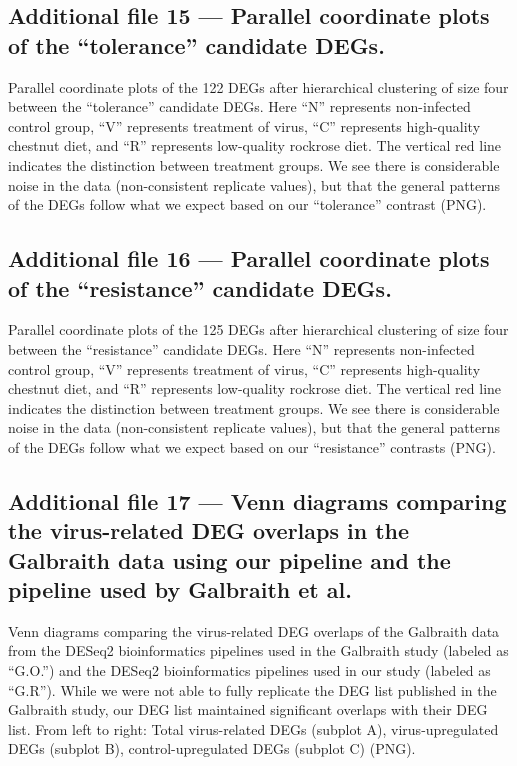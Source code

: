 \documentclass{bmcart}
\begin{document}
\begin{linenumbers}
\begin{backmatter}
   \subsection*{Additional file 15 --- Parallel coordinate plots of the ``tolerance'' candidate DEGs.}    
    Parallel coordinate plots of the 122 DEGs after hierarchical clustering of size four between the ``tolerance'' candidate DEGs. Here ``N'' represents non-infected control group, ``V'' represents treatment of virus, ``C'' represents high-quality chestnut diet, and ``R'' represents low-quality rockrose diet. The vertical red line indicates the distinction between treatment groups. We see there is considerable noise in the data (non-consistent replicate values), but that the general patterns of the DEGs follow what we expect based on our ``tolerance'' contrast (PNG).
    
   \subsection*{Additional file 16 --- Parallel coordinate plots of the ``resistance'' candidate DEGs.}    
    Parallel coordinate plots of the 125 DEGs after hierarchical clustering of size four between the ``resistance'' candidate DEGs. Here ``N'' represents non-infected control group, ``V'' represents treatment of virus, ``C'' represents high-quality chestnut diet, and ``R'' represents low-quality rockrose diet. The vertical red line indicates the distinction between treatment groups. We see there is considerable noise in the data (non-consistent replicate values), but that the general patterns of the DEGs follow what we expect based on our ``resistance'' contrasts (PNG).

   \subsection*{Additional file 17 --- Venn diagrams comparing the virus-related DEG overlaps in the Galbraith data using our pipeline and the pipeline used by Galbraith et al.}
  Venn diagrams comparing the virus-related DEG overlaps of the Galbraith data from the DESeq2 bioinformatics pipelines used in the Galbraith study (labeled as ``G.O.'') and the DESeq2 bioinformatics pipelines used in our study (labeled as ``G.R''). While we were not able to fully replicate the DEG list published in the Galbraith study, our DEG list maintained significant overlaps with their DEG list. From left to right: Total virus-related DEGs (subplot A), virus-upregulated DEGs (subplot B), control-upregulated DEGs (subplot C) (PNG).
    

\end{backmatter}
\end{linenumbers}
\end{document}
